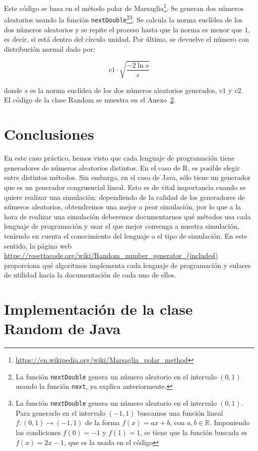 \documentclass[12pt,a4paper,twoside,openright,titlepage,final]{article}
\begin{document}
Este código se basa en el método polar de Marsaglia\footnote{\url{https://en.wikipedia.org/wiki/Marsaglia_polar_method}}. Se generan dos números aleatorios usando la función \texttt{nextDouble}\footnote{La función \texttt{nextDouble} genera un número aleatorio en el intervalo $(0,1)$ usando la función \texttt{next}, ya explica anteriormente.}\footnote{La función \texttt{nextDouble} genera un número aleatorio en el intervalo $(0,1)$. Para generarlo en el intervalo $(-1,1)$ buscamos una función lineal $f: (0,1) \to (-1,1)$ de la forma $f(x) = ax + b$, con $a,b \in \mathbb{R}$. Imponiendo las condiciones $f(0)= -1$ y $f(1) = 1$, se tiene que la función buscada es $f(x) = 2x-1$, que es la usada en el código}. Se calcula la norma euclídea de los dos números aleatorios y se repite el proceso hasta que la norma es menor que $1$, es decir, si está dentro del círculo unidad. Por último, se devuelve el número con distribución normal dado por:

\[ v1 \cdot \sqrt{\dfrac{-2 \ln s}{s}} \]

donde $s$ es la norma euclídea de los dos números aleatorios generados, $v1$ y $v2$.\\

El código de la clase Random se muestra en el Anexo~\ref{app:Random}.

\section{Conclusiones}

En este caso práctico, hemos visto que cada lenguaje de programación tiene generadores de números aleatorios distintos. En el caso de R, es posible elegir entre distintos métodos. Sin embargo, en el caso de Java, sólo tiene un generador que es un generador congruencial lineal. Esto es de vital importancia cuando se quiere realizar una simulación: dependiendo de la calidad de los generadores de números aleatorios, obtendremos una mejor o peor simulación, por lo que a la hora de realizar una simulación deberemos documentarnos qué métodos usa cada lenguaje de programación y usar el que mejor convenga a nuestra simulación, teniendo en cuenta el conocimiento del lenguaje o el tipo de simulación. En este sentido, la página web \url{https://rosettacode.org/wiki/Random_number_generator_(included)} proporciona qué algoritmos implementa cada lenguaje de programación y enlaces de utilidad hacia la documentación de cada uno de ellos.  

\newpage
\appendix
\section{Implementación de la clase Random de Java}\label{app:Random}
\end{document}
